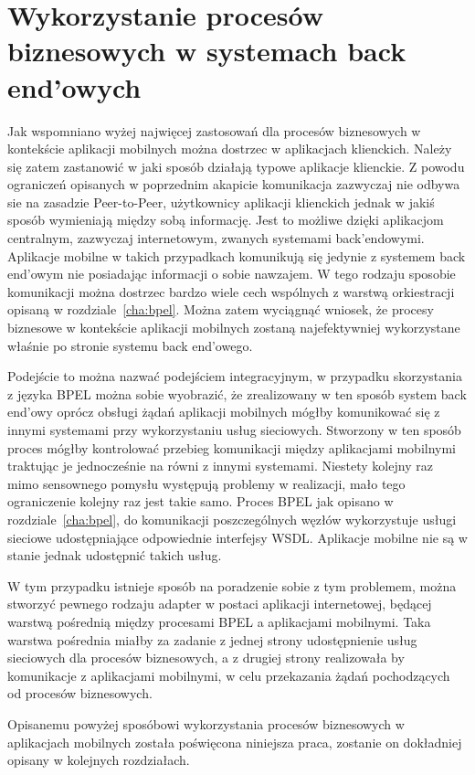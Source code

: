 
\section{Wykorzystanie procesów biznesowych w systemach back end'owych}
\label{sec:integracjaProcesówZAplikacjamiMobilnymi}

Jak wspomniano wyżej najwięcej zastosowań dla procesów biznesowych w kontekście aplikacji mobilnych można dostrzec w aplikacjach klienckich. Należy się zatem zastanowić w jaki sposób działają typowe aplikacje klienckie. Z powodu ograniczeń opisanych w poprzednim akapicie komunikacja zazwyczaj nie odbywa sie na zasadzie Peer-to-Peer, użytkownicy aplikacji klienckich jednak w jakiś sposób wymieniają między sobą informację. Jest to możliwe dzięki aplikacjom centralnym, zazwyczaj internetowym, zwanych systemami back'endowymi. Aplikacje mobilne w takich przypadkach komunikują się jedynie z systemem back end'owym nie posiadając informacji o sobie nawzajem. W tego rodzaju sposobie komunikacji można dostrzec bardzo wiele cech wspólnych z warstwą orkiestracji opisaną w rozdziale~\ref{cha:bpel}. Można zatem wyciągnąć wniosek, że procesy biznesowe w kontekście aplikacji mobilnych zostaną najefektywniej wykorzystane właśnie po stronie systemu back end'owego. 

Podejście to można nazwać podejściem integracyjnym, w przypadku skorzystania z języka BPEL można sobie wyobrazić, że zrealizowany w ten sposób system back end'owy oprócz obsługi żądań aplikacji mobilnych mógłby komunikować się z innymi systemami przy wykorzystaniu usług sieciowych. Stworzony w ten sposób proces mógłby kontrolować przebieg komunikacji między aplikacjami mobilnymi traktując je jednocześnie na równi z innymi systemami.  Niestety kolejny raz mimo sensownego pomysłu występują problemy w realizacji, mało tego ograniczenie kolejny raz jest takie samo. Proces BPEL jak opisano w rozdziale~\ref{cha:bpel}, do komunikacji poszczególnych węzłów wykorzystuje usługi sieciowe udostępniające odpowiednie interfejsy WSDL. Aplikacje mobilne nie są w stanie jednak udostępnić takich usług. 

W tym przypadku istnieje sposób na poradzenie sobie z tym problemem, można stworzyć pewnego rodzaju adapter w postaci aplikacji internetowej, będącej warstwą pośrednią między procesami BPEL a aplikacjami mobilnymi. Taka warstwa pośrednia miałby za zadanie z jednej strony udostępnienie usług sieciowych dla procesów biznesowych, a z drugiej strony realizowała by komunikacje z aplikacjami mobilnymi, w celu przekazania żądań pochodzących od procesów biznesowych. 

Opisanemu powyżej sposóbowi wykorzystania procesów biznesowych w aplikacjach mobilnych została poświęcona niniejsza praca, zostanie on dokładniej opisany w kolejnych rozdziałach.
